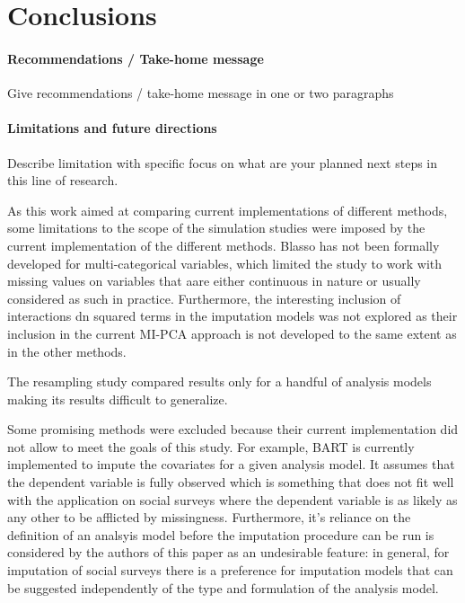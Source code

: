 \section{Conclusions}

\paragraph{Recommendations / Take-home message}
	Give recommendations / take-home message in one or two paragraphs

\paragraph{Limitations and future directions}
	Describe limitation with specific focus on what are your planned next steps
	in this line of research.

	As this work aimed at comparing current implementations of different methods, some limitations
	to the scope of the simulation studies were imposed by the current implementation of the different
	methods.
	Blasso has not been formally developed for multi-categorical variables, which limited the study 
	to work with missing values on variables that aare either continuous in nature or usually considered
	as such in practice.
	Furthermore, the interesting inclusion of interactions dn squared terms in the imputation models was
	not explored as their inclusion in the current MI-PCA approach is not developed to the same extent as 
	in the other methods.
	
	The resampling study compared results only for a handful of analysis models making its results difficult
	to generalize.

	Some promising methods were excluded because their current implementation did not allow to meet
	the goals of this study.
	For example, BART is currently implemented to impute the covariates for a given analysis model.
	It assumes that the dependent variable is fully observed which is something that does not fit well
	with the application on social surveys where the dependent variable is as likely as any other to be 
	afflicted by missingness.
	Furthermore, it's reliance on the definition of an analsyis model before the imputation procedure can 
	be run is considered by the authors of this paper as an undesirable feature: in general, for imputation
	of social surveys there is a preference for imputation models that can be suggested independently of
	the type and formulation of the analysis model.

